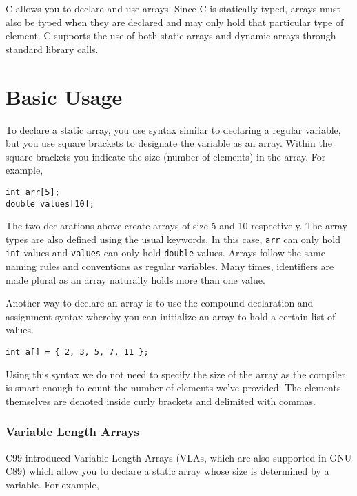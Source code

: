 

C allows you to declare and use arrays.  Since C is statically
typed, arrays must also be typed when they are declared and
may only hold that particular type of element.  C supports the
use of both static arrays and dynamic arrays through standard
library calls.

\section{Basic Usage}

To declare a static array, you use syntax similar to declaring
a regular variable, but you use square brackets to designate
the variable as an array.  Within the square brackets you
indicate the size (number of elements) in the array.  For
example, 

\begin{verbatim}
int arr[5];
double values[10];
\end{verbatim}

The two declarations above create arrays of size 5 and 10 
respectively.  The array types are also defined using the usual
keywords.  In this case, \texttt{arr} can only hold
\texttt{int} values and \texttt{values} can only
hold \texttt{double} values.  Arrays follow the same
naming rules and conventions as regular variables.  Many 
times, identifiers are made plural as an array naturally holds
more than one value.  

Another way to declare an array is to use the compound declaration
and assignment syntax whereby you can initialize an array to hold
a certain list of values.  

\begin{verbatim}
int a[] = { 2, 3, 5, 7, 11 };
\end{verbatim}

Using this syntax we do not need to specify the size of the array 
as the compiler is smart enough to count the number of elements
we've provided.  The elements themselves are denoted inside curly
brackets and delimited with commas.

\subsubsection{Variable Length Arrays}

C99 introduced Variable Length Arrays (VLAs, which are also 
supported in GNU C89) which allow you to declare a static
array whose size is determined by a variable.  For example, 

